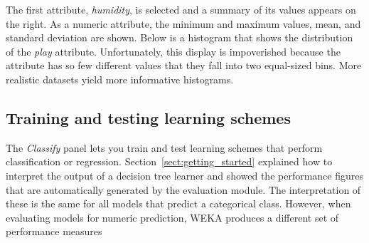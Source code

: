 The first attribute, \textit{humidity}, is selected and a summary of
its values appears on the right. As a numeric attribute, the minimum
and maximum values, mean, and standard deviation are shown. Below is a
histogram that shows the distribution of the \textit{play}
attribute. Unfortunately, this display is impoverished because the
attribute has so few different values that they fall into two
equal-sized bins. More realistic datasets yield more informative
histograms.

\subsection{Training and testing learning schemes}

The \textit{Classify} panel lets you train and test learning schemes
that perform classification or
regression. Section~\ref{sect:getting_started} explained how to
interpret the output of a decision tree learner and showed the
performance figures that are automatically generated by the evaluation
module. The interpretation of these is the same for all models that
predict a categorical class. However, when evaluating models for
numeric prediction, WEKA produces a different set of performance
measures

